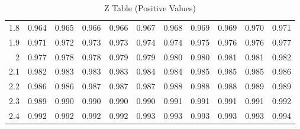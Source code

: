 \documentclass[11pt, chapterprefix=true]{scrbook}\usepackage[]{graphicx}\usepackage[]{color}
\begin{document}
\begin{table}[ht]
\begin{tabular}{rllllllllll}
  1.8 & 0.964 & 0.965 & 0.966 & 0.966 & 0.967 & 0.968 & 0.969 & 0.969 & 0.970 & 0.971 \\ 
  1.9 & 0.971 & 0.972 & 0.973 & 0.973 & 0.974 & 0.974 & 0.975 & 0.976 & 0.976 & 0.977 \\ 
  2 & 0.977 & 0.978 & 0.978 & 0.979 & 0.979 & 0.980 & 0.980 & 0.981 & 0.981 & 0.982 \\ 
  2.1 & 0.982 & 0.983 & 0.983 & 0.983 & 0.984 & 0.984 & 0.985 & 0.985 & 0.985 & 0.986 \\ 
  2.2 & 0.986 & 0.986 & 0.987 & 0.987 & 0.987 & 0.988 & 0.988 & 0.988 & 0.989 & 0.989 \\ 
  2.3 & 0.989 & 0.990 & 0.990 & 0.990 & 0.990 & 0.991 & 0.991 & 0.991 & 0.991 & 0.992 \\ 
  2.4 & 0.992 & 0.992 & 0.992 & 0.992 & 0.993 & 0.993 & 0.993 & 0.993 & 0.993 & 0.994 \\ 
   \hline
\end{tabular}
\caption{Z Table (Positive Values)} 
\end{table}

\label{TBL61}

\twocolumn

\section{}
\end{document}

